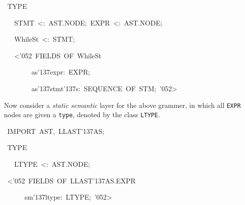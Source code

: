 {{{\display ~TYPE}\noindent\par
{\display ~~~STMT~<:~AST.NODE;~EXPR~<:~AST.NODE;}\noindent\par
{\display ~~~WhileSt~<:~STMT;}\noindent\par
{\display ~~~<\char'052{}~FIELDS~OF~WhileSt}\noindent\par
{\display ~~~~~~~~as\char'137{}expr:~EXPR;}\noindent\par
{\display ~~~~~~~~as\char'137{}stmt\char'137{}s:~SEQUENCE~OF~STM;~\char'052{}>}\noindent\par
{\display }\noindent\par
\medskip\noindent%
Now consider a {\em static semantic} layer for the above grammer, in which
all {\tt EXPR} nodes are given a {\tt type}, denoted by the class {\tt LTYPE}.
\par
\par{}\noindent\par
{\display ~IMPORT~AST,~LLAST\char'137{}AS;}\noindent\par
{\display ~TYPE}\noindent\par
{\display ~~~LTYPE~<:~AST.NODE;}\noindent\par
{\display }\noindent\par
{\display ~<\char'052{}~FIELDS~OF~LLAST\char'137{}AS.EXPR}\noindent\par
{\display ~~~~~~sm\char'137{}ltype:~LTYPE;~\char'052{}>}\noindent\par
\medskip\noindent%
\par
}}
